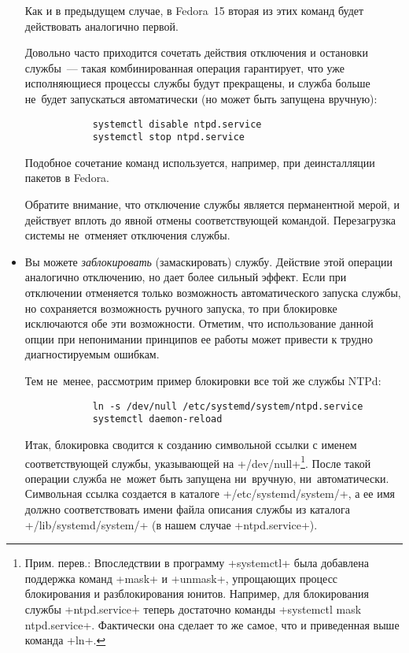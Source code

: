 \documentclass[10pt,oneside,a4paper]{article}
\begin{document}
\begin{itemize}
		Как и в предыдущем случае, в Fedora~15 вторая из этих команд
		будет действовать аналогично первой.

		Довольно часто приходится сочетать действия отключения и
		остановки службы~--- такая комбинированная операция
		гарантирует, что уже исполняющиеся процессы службы будут
		прекращены, и служба больше не~будет запускаться автоматически
		(но может быть запущена вручную):
		\begin{Verbatim}
			systemctl disable ntpd.service
			systemctl stop ntpd.service
		\end{Verbatim}
		Подобное сочетание команд используется,
		например, при деинсталляции пакетов в Fedora.

		Обратите внимание, что отключение службы является перманентной
		мерой, и действует вплоть до явной отмены соответствующей
		командой. Перезагрузка системы не~отменяет отключения службы.

	\item Вы можете \emph{заблокировать} (замаскировать) службу. Действие
		этой операции аналогично отключению, но дает более сильный
		эффект. Если при отключении отменяется только возможность
		автоматического запуска службы, но сохраняется возможность
		ручного запуска, то при блокировке исключаются обе эти
		возможности. Отметим, что использование данной опции при
		непонимании принципов ее работы может привести к трудно
		диагностируемым ошибкам.

		Тем не~менее, рассмотрим пример блокировки все той же службы NTPd:
		\begin{Verbatim}
			ln -s /dev/null /etc/systemd/system/ntpd.service
			systemctl daemon-reload
		\end{Verbatim}

		Итак, блокировка сводится к созданию символьной ссылки
		с именем соответствующей службы, указывающей на
		+/dev/null+\footnote{Прим. перев.: Впоследствии в программу
		+systemctl+ была добавлена поддержка команд +mask+ и +unmask+,
		упрощающих процесс блокирования и разблокирования юнитов.
		Например, для блокирования службы +ntpd.service+ теперь
		достаточно команды +systemctl mask ntpd.service+. Фактически
		она сделает то же самое, что и приведенная выше команда +ln+.}.
		После такой операции служба не~может быть запущена ни~вручную,
		ни~автоматически. Символьная ссылка создается в каталоге
		+/etc/systemd/system/+, а ее имя должно соответствовать имени
		файла описания службы из каталога +/lib/systemd/system/+ (в
		нашем случае +ntpd.service+).


\end{itemize}
\end{document}
